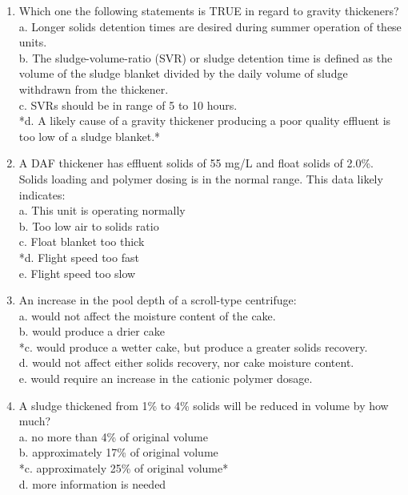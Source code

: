 \begin{enumerate}
\item  Which one the following statements is TRUE in regard to gravity thickeners? \\

a. Longer solids detention times are desired during summer operation of these units. \\
b. The sludge-volume-ratio (SVR) or sludge detention time is defined as the volume of the sludge blanket divided by the daily volume of sludge withdrawn from the thickener. \\
c. SVRs should be in range of 5 to 10 hours. \\
*d. A likely cause of a gravity thickener producing a poor quality effluent is too low of a sludge blanket.* \\

\item  A DAF thickener has effluent solids of 55 mg/L and float solids of 2.0\%. Solids loading and polymer dosing is in the normal range. This data likely indicates: \\

a. This unit is operating normally \\
b. Too low air to solids ratio \\
c. Float blanket too thick \\
*d. Flight speed too fast \\
e. Flight speed too slow \\

\item  An increase in the pool depth of a scroll-type centrifuge: \\

a. would not affect the moisture content of the cake. \\
b. would produce a drier cake \\
*c. would produce a wetter cake, but produce a greater solids recovery. \\
d. would not affect either solids recovery, nor cake moisture content. \\
e. would require an increase in the cationic polymer dosage. \\

\item  A sludge thickened from 1\% to 4\% solids will be reduced in volume by how much? \\

a. no more than 4\% of original volume \\
b. approximately 17\% of original volume \\
*c. approximately 25\% of original volume* \\
d. more information is needed \\


\end{enumerate}
